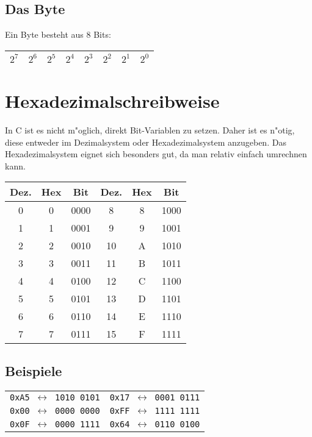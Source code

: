 \documentclass[11pt,a4paper,smallheadings,twocolumn,headexclude,footexclude]{scrartcl}
\begin{document}
\subsection*{Das Byte}
Ein Byte besteht aus 8 Bits:\\
\begin{centering}
\begin{tabular}{|c|c|c|c|c|c|c|c|}
\hline
$2^7$ &
$2^6$ &
$2^5$ &
$2^4$ &
$2^3$ &
$2^2$ &
$2^1$ &
$2^0$ \\
\hline
\end{tabular}
\end{centering}

\section*{Hexadezimalschreibweise}
In C ist es nicht m"oglich, direkt Bit-Variablen zu setzen. Daher ist es n"otig, diese entweder
im Dezimalsystem oder Hexadezimalsystem anzugeben. Das Hexadezimalsystem eignet sich besonders
gut, da man relativ einfach umrechnen kann.\\
\begin{tabular}{c c c | c c c}
Dez. & Hex & Bit & Dez. & Hex & Bit \\
\hline
0 & 0 & 0000 & 8 & 8 & 1000 \\
1 & 1 & 0001 & 9 & 9 & 1001 \\
2 & 2 & 0010 &10 & A & 1010 \\
3 & 3 & 0011 &11 & B & 1011 \\
4 & 4 & 0100 &12 & C & 1100 \\
5 & 5 & 0101 &13 & D & 1101 \\
6 & 6 & 0110 &14 & E & 1110 \\
7 & 7 & 0111 &15 & F & 1111 \\
\end{tabular}
\subsection*{Beispiele}
\begin{tabular}{c | c}
\texttt{0xA5 $\leftrightarrow$ 1010 0101} &
\texttt{0x17 $\leftrightarrow$ 0001 0111} \\

\texttt{0x00 $\leftrightarrow$ 0000 0000} &
\texttt{0xFF $\leftrightarrow$ 1111 1111} \\

\texttt{0x0F $\leftrightarrow$ 0000 1111} &
\texttt{0x64 $\leftrightarrow$ 0110 0100} \\
\end{tabular}
\end{document}
